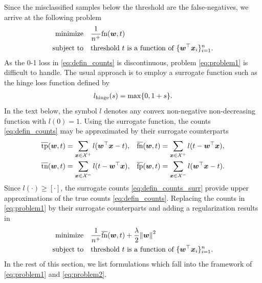 \documentclass{Thesis}
\newcommand{\Brac}[2][r]{%
  \ifx r#1 \left(       #2 \right)       \else
  \ifx c#1 \left\{      #2 \right\}      \else
  \ifx s#1 \left[       #2 \right]       \else
  \ifx v#1 \left\vert   #2 \right\vert   \else
  \ifx a#1 \left\langle #2 \right\rangle \else
  \ifx t#1 \left\lceil  #2 \right\rceil  \else
  \ifx b#1 \left\lfloor #2 \right\rfloor \else
  \ifx n#1 \left\|      #2 \right\|      \else
  \mathrm{Illegal~option}%
  \fi\fi\fi\fi\fi\fi\fi\fi
}
\newcommand{\Xc}{\mathcal{X}}
\newcommand{\norm}[1]{\Brac[n]{#1}}
\newcommand{\minimize}{\operatorname*{minimize}}
\newcommand{\st}{\operatorname{subject\ to}}
\newcommand{\fn}{\textnormal{fn}}
\newcommand{\tps}{\overline{\textnormal{tp}}}
\newcommand{\tns}{\overline{\textnormal{tn}}}
\newcommand{\fps}{\overline{\textnormal{fp}}}
\newcommand{\fns}{\overline{\textnormal{fn}}}
\begin{document}
Since the misclassified samples below the threshold are the false-negatives, we arrive at the following problem
\begin{equation}\label{eq:problem1}
  \begin{aligned}
    \minimize
    & \quad \frac{1}{n^{+}}\fn(\bm{w}, t)\\
    \st
    & \quad \text{threshold } t \text{ is a function of }\{\bm{w}^\top \bm{x}_i\}_{i = 1}^n.
  \end{aligned}
\end{equation}
As the 0-1 loss in \eqref{eq:defin_counts} is discontinuous, problem \eqref{eq:problem1} is difficult to handle. The usual approach is to employ a surrogate function such as the hinge loss function defined by
\begin{equation}\label{eq:defin_surrogate}
  \begin{aligned}
    l_{\rm hinge}(s) & =\max\Brac[c]{0, 1 + s}.\\
  \end{aligned}
\end{equation}
In the text below, the symbol $l$ denotes any convex non-negative non-decreasing function with $l(0) = 1$. Using the surrogate function, the counts \eqref{eq:defin_counts} may be approximated by their surrogate counterparts
\begin{equation}\label{eq:defin_counts_surr}
  \begin{aligned}
    \tps(\bm{w}, t) & = \sum_{\bm{x} \in \Xc^+}l(\bm{w}^\top \bm{x}-t), &
    \fns(\bm{w}, t) & = \sum_{\bm{x} \in \Xc^+}l(t - \bm{w}^\top \bm{x}), \\
    \tns(\bm{w}, t) & = \sum_{\bm{x} \in \Xc^-}l(t - \bm{w}^\top \bm{x}),&
    \fps(\bm{w}, t) & = \sum_{\bm{x} \in \Xc^-}l(\bm{w}^\top \bm{x}-t).
  \end{aligned}
\end{equation}
Since $l(\cdot)\ge[\cdot]$, the surrogate counts \eqref{eq:defin_counts_surr} provide upper approximations of the true counts \eqref{eq:defin_counts}. Replacing the counts in \eqref{eq:problem1} by their surrogate counterparts and adding a regularization results in
\begin{equation}\label{eq:problem2}
  \begin{aligned}
    \minimize
    & \quad \frac{1}{n^{+}}\fns(\bm{w}, t) + \frac{\lambda}{2}\norm{\bm{w}}^2 \\
    \st
    & \quad \text{threshold } t \text{ is a function of }\{\bm{w}^\top \bm{x}_i\}_{i = 1}^n.
  \end{aligned}
\end{equation}
In the rest of this section, we list formulations which fall into the framework of \eqref{eq:problem1} and \eqref{eq:problem2}.
\end{document}
